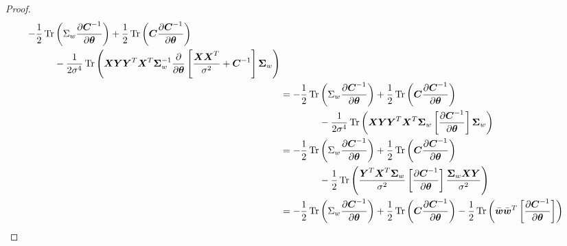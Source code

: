 \begin{proof}
\begin{equation*}
\begin{aligned}
\begin{aligned}[t]
            -\frac{1}{2}\operatorname{Tr}&\bracka{\Sigma_w\frac{\partial \boldsymbol C^{-1}}{\partial \boldsymbol \theta}} + \frac{1}{2}\operatorname{Tr}\bracka{\boldsymbol C\frac{\partial \boldsymbol C^{-1}}{\partial \boldsymbol \theta}} \\
            &- \frac{1}{2\sigma^4}\operatorname{Tr}\bracka{\boldsymbol X\boldsymbol Y\boldsymbol Y^T\boldsymbol X^T \boldsymbol \Sigma^{-1}_w\frac{\partial}{\partial \boldsymbol \theta}\brackb{ \frac{\boldsymbol X\boldsymbol X^T}{\sigma^2} + \boldsymbol C^{-1}}\boldsymbol \Sigma_w} \\
        \end{aligned}  \\
        &=\begin{aligned}[t]
            -\frac{1}{2}\operatorname{Tr}&\bracka{\Sigma_w\frac{\partial \boldsymbol C^{-1}}{\partial \boldsymbol \theta}} + \frac{1}{2}\operatorname{Tr}\bracka{\boldsymbol C\frac{\partial \boldsymbol C^{-1}}{\partial \boldsymbol \theta}} \\
            &- \frac{1}{2\sigma^4}\operatorname{Tr}\bracka{\boldsymbol X\boldsymbol Y\boldsymbol Y^T\boldsymbol X^T \boldsymbol \Sigma_w\brackb{ \frac{\partial\boldsymbol C^{-1}}{\partial \boldsymbol \theta} }\boldsymbol \Sigma_w} \\
        \end{aligned}  \\
        &=\begin{aligned}[t]
            -\frac{1}{2}\operatorname{Tr}&\bracka{\Sigma_w\frac{\partial \boldsymbol C^{-1}}{\partial \boldsymbol \theta}} + \frac{1}{2}\operatorname{Tr}\bracka{\boldsymbol C\frac{\partial \boldsymbol C^{-1}}{\partial \boldsymbol \theta}} \\
            &- \frac{1}{2}\operatorname{Tr}\bracka{\frac{\boldsymbol Y^T\boldsymbol X^T \boldsymbol \Sigma_w}{\sigma^2}\brackb{ \frac{\partial\boldsymbol C^{-1}}{\partial \boldsymbol \theta} }\frac{\boldsymbol \Sigma_w\boldsymbol X\boldsymbol Y}{\sigma^2}} \\
        \end{aligned}  \\
        &=\begin{aligned}[t]
            -\frac{1}{2}\operatorname{Tr}&\bracka{\Sigma_w\frac{\partial \boldsymbol C^{-1}}{\partial \boldsymbol \theta}} + \frac{1}{2}\operatorname{Tr}\bracka{\boldsymbol C\frac{\partial \boldsymbol C^{-1}}{\partial \boldsymbol \theta}} - \frac{1}{2}\operatorname{Tr}\bracka{\bar{\boldsymbol w}\bar{\boldsymbol w}^T\brackb{ \frac{\partial\boldsymbol C^{-1}}{\partial \boldsymbol \theta} }} \\

\end{aligned}
\end{aligned}
\end{equation*}
\end{proof}
